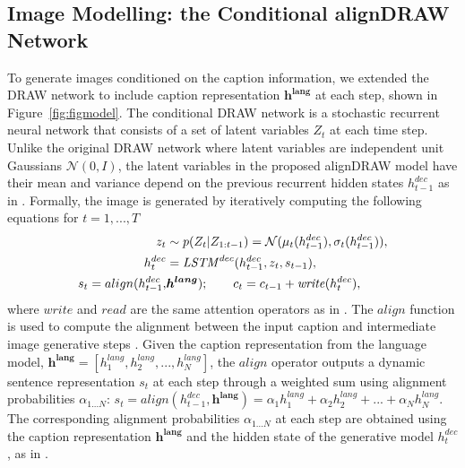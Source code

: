 \documentclass{article} %
\newcommand{\comm}[1]{}
\newcommand{\hlang}{h^{lang}}
\newcommand{\hlangall}{\boldsymbol{h^{lang}}}
\newcommand{\hdec}{h^{dec}}
\newcommand{\readop}{\mathit{read}}
\newcommand{\writeop}{\mathit{write}}
\newcommand{\decoder}{\mathit{LSTM}^{dec}}
\newcommand{\canv}{c}
\newcommand{\lat}{z}
\newcommand{\Lat}{Z}
\newcommand{\prior}{p}
\begin{document}
\subsection{Image Modelling: the Conditional alignDRAW Network}
\comm{
The DRAW network \cite{gregor_draw} is a sequential probabilistic model generating images by accumulating the output at each iterative step. While the original DRAW network assumes the latent variables are independent, it has shown in \citep{bachman_sdm} the model performance is improved by including the dependencies of latent variables. 
}
To generate images conditioned on the caption information, we extended the DRAW network \citep{gregor_draw} to include caption representation $\hlangall$ at each step, shown in Figure~\ref{fig:figmodel}. The conditional DRAW network is a stochastic recurrent neural network that consists of a set of latent variables $\Lat_t$ at each time step. Unlike the original DRAW network where latent variables are independent unit Gaussians $\mathcal{N}(0, I)$, the latent variables in the proposed alignDRAW model have their mean and variance depend on the previous recurrent hidden states $\hdec_{t-1}$ as in \cite{bachman_sdm}. Formally, the image is generated by iteratively computing the following equations for $t=1,...,T$
\begin{align}
\vspace{-0.1in}
\label{eq:x_hat}
\lat_t &\sim \prior(\Lat_t|\Lat_{1:t-1}) = \mathcal{N}(\mu_{t}(\hdec_{t-1}), \sigma_{t}(\hdec_{t-1})),\\
\hdec_t &= \decoder(\hdec_{t-1}, z_t, s_{t-1}), \\
s_{t} = align(\hdec_{t-1}, & \hlangall); \quad \quad
\canv_t = \canv_{t-1} + \writeop(\hdec_t), 
\label{eq:write}
\end{align}
where $\writeop$ and $\readop$ are the same attention operators as in \citep{gregor_draw}.
The $align$ function is used to compute the alignment between the input caption and intermediate image generative steps \citep{bahdanau_mt}. Given the caption representation from the language model, $\hlangall = [\hlang_{1}, \hlang_{2}, ..., \hlang_{N}]$, the $align$ operator outputs a dynamic sentence representation $s_t$ at each step through a weighted sum using alignment probabilities $\alpha_{1...N}$:
$s_t=align(\hdec_{t-1}, \hlangall) = \alpha_{1}\hlang_{1} + \alpha_{2}\hlang_{2} + ... + \alpha_{N}\hlang_{N}.$
The corresponding alignment probabilities $\alpha_{1...N}$ at each step are obtained using the caption representation $\hlangall$ and the hidden state of the generative model $\hdec_{t}$, as in \citep{bahdanau_mt}.
\comm{
\begin{align}
e_{tj} &= v^{T}tanh(U\hlang_{j} + W\hdec_{t} + b)\\
\alpha_{j} &= \frac{exp(e_{tj})}{\sum_{j=1}^{N}exp(e_{tj})}.
\end{align}
}
\comm{
Here $\hlang_{0}$ is initialized to the learned bias.
Setting $\alpha_{1...N}$ to $\frac{1}{N}$ turns the encoder into the vanilla model introduced in \citep{cho_mt} without the attention. 
}
\end{document}
